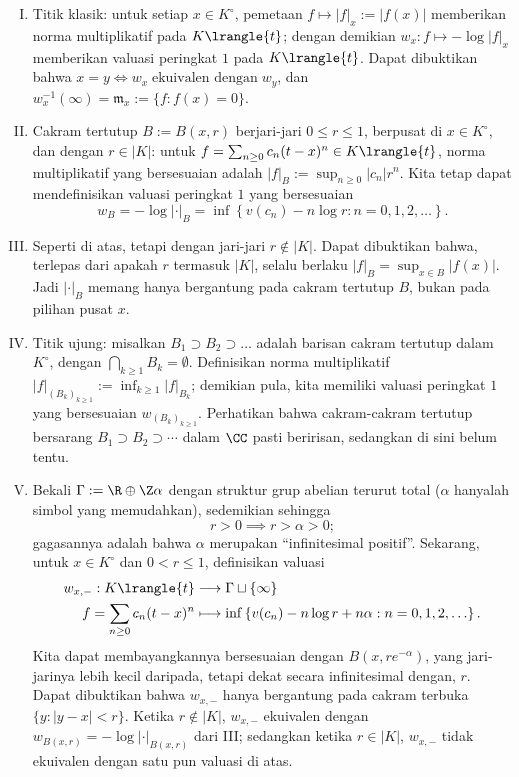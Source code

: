 \begin{enumerate}[I.]
	\item Titik klasik: untuk setiap $x \in K^\circ$, pemetaan $f \mapsto |f|_x := |f(x)|$ memberikan norma multiplikatif pada $K\lrangle{t}$; dengan demikian $w_x: f \mapsto -\log|f|_x$ memberikan valuasi peringkat $1$ pada $K\lrangle{t}$. Dapat dibuktikan bahwa $x=y \iff w_x \;\text{ekuivalen dengan}\; w_y$, dan $w_x^{-1}(\infty) = \mathfrak{m}_x := \{f: f(x)=0\}$.
	\item Cakram tertutup $B := B(x,r)$ berjari-jari $0 \leq r \leq 1$, berpusat di $x \in K^\circ$, dan dengan $r \in |K|$: untuk $f = \sum_{n \geq 0} c_n (t-x)^n \in K\lrangle{t}$, norma multiplikatif yang bersesuaian adalah $|f|_B := \sup_{n \geq 0} |c_n| r^n$. Kita tetap dapat mendefinisikan valuasi peringkat $1$ yang bersesuaian
		\[ w_B = -\log|\cdot|_B = \inf\left\{ v(c_n) - n \log r : n=0,1,2,\ldots \right\}. \]
	\item Seperti di atas, tetapi dengan jari-jari $r \notin |K|$. Dapat dibuktikan bahwa, terlepas dari apakah $r$ termasuk $|K|$, selalu berlaku $|f|_B = \sup_{x \in B} |f(x)|$. Jadi $|\cdot|_B$ memang hanya bergantung pada cakram tertutup $B$, bukan pada pilihan pusat $x$. 
	\item Titik ujung: misalkan $B_1 \supset B_2 \supset \ldots$ adalah barisan cakram tertutup dalam $K^\circ$, dengan $\bigcap_{k \geq 1} B_k = \emptyset$. Definisikan norma multiplikatif $|f|_{(B_k)_{k \geq 1}} := \inf_{k \geq 1} |f|_{B_k}$; demikian pula, kita memiliki valuasi peringkat $1$ yang bersesuaian $w_{(B_k)_{k \geq 1}}$. Perhatikan bahwa cakram-cakram tertutup bersarang $B_1 \supset B_2 \supset \cdots$ dalam $\CC$ pasti beririsan, sedangkan di sini belum tentu.
	\item Bekali $\Gamma := \R \oplus \Z\alpha$ dengan struktur grup abelian terurut total ($\alpha$ hanyalah simbol yang memudahkan), sedemikian sehingga
		\[ r > 0 \implies r > \alpha > 0; \]
		gagasannya adalah bahwa $\alpha$ merupakan ``infinitesimal positif''. Sekarang, untuk $x \in K^\circ$ dan $0 < r \leq 1$, definisikan valuasi
		\begin{align*}
			w_{x,-}: K\lrangle{t} & \longrightarrow \Gamma \sqcup\{\infty\} \\
			f = \sum_{n \geq 0} c_n (t-x)^n & \longmapsto \inf\left\{ v(c_n) - n \log r + n\alpha : n=0,1,2, \ldots \right\}.
		\end{align*}
		Kita dapat membayangkannya bersesuaian dengan $B(x, re^{-\alpha})$, yang jari-jarinya lebih kecil daripada, tetapi dekat secara infinitesimal dengan, $r$. Dapat dibuktikan bahwa $w_{x,-}$ hanya bergantung pada cakram terbuka $\{y: |y-x| < r\}$. Ketika $r \notin |K|$, $w_{x,-}$ ekuivalen dengan $w_{B(x,r)} = -\log|\cdot|_{B(x,r)}$ dari III; sedangkan ketika $r \in |K|$, $w_{x,-}$ tidak ekuivalen dengan satu pun valuasi di atas.
		

\end{enumerate}
